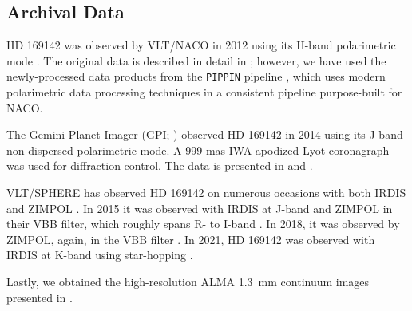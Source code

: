 \subsection{Archival Data\label{sec:obs_archive}}

HD 169142 was observed by VLT/NACO in 2012 using its H-band polarimetric mode \citep{quanz_very_2011}. The original data is described in detail in \citet{quanz_gaps_2013}; however, we have used the newly-processed data products from the \texttt{PIPPIN} pipeline \citep{regt_polarimetric_2024}, which uses modern polarimetric data processing techniques in a consistent pipeline purpose-built for NACO. 

The Gemini Planet Imager (GPI; \citealt{macintosh_first_2014}) observed HD 169142 in 2014 using its J-band non-dispersed polarimetric mode. A 999 mas IWA apodized Lyot coronagraph was used for diffraction control. The data is presented in \citet{monnier_polarized_2017} and \citet{rich_gemini-lights_2022}. 

VLT/SPHERE \citep{beuzit_sphere_2019} has observed HD 169142 on numerous occasions with both IRDIS \citep{boer_polarimetric_2020,holstein_polarimetric_2020} and ZIMPOL \citep{schmid_spherezimpol_2018}. In 2015 it was observed with IRDIS at J-band \citep{pohl_circumstellar_2017} and ZIMPOL in their VBB filter, which roughly spans R- to I-band \citep{bertrang_hd_2018,tschudi_quantitative_2021}. In 2018, it was observed by ZIMPOL, again, in the VBB filter \citep{bertrang_moving_2020}. In 2021, HD 169142 was observed with IRDIS at K-band using star-hopping \citep{ren_protoplanetary_2023}.

Lastly, we obtained the high-resolution ALMA \SI{1.3}{\milli\meter} continuum images presented in \citet{perez_dust_2019}.

